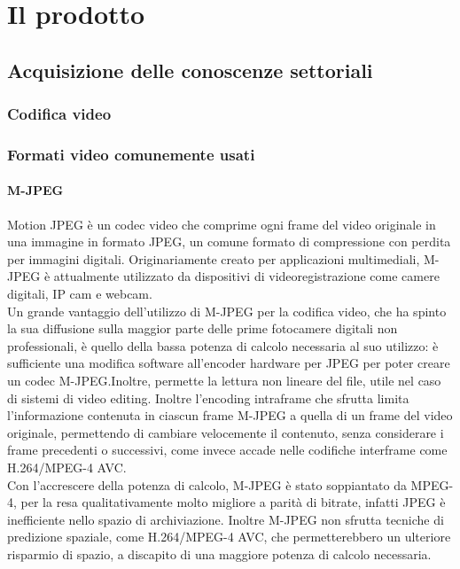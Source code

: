 \chapter{Il prodotto\label{cap:ilprodotto}}
\section{Acquisizione delle conoscenze settoriali}
	 \subsection{Codifica video}

	 \subsection{Formati video comunemente usati}
			\subsubsection{M-JPEG}
			Motion JPEG	è un codec video che comprime ogni frame del video originale in una immagine in formato JPEG, un comune formato di compressione con perdita per immagini digitali. Originariamente creato per applicazioni multimediali, M-JPEG è attualmente utilizzato da dispositivi di videoregistrazione come camere digitali, IP cam e webcam.
			\\
			Un grande vantaggio dell'utilizzo di M-JPEG per la codifica video, che ha spinto la sua diffusione sulla maggior parte delle prime fotocamere digitali non professionali, è quello della bassa potenza di calcolo necessaria al suo utilizzo: è sufficiente una modifica software all'encoder hardware per JPEG per poter creare un codec M-JPEG.\@ Inoltre, permette la lettura non lineare del file, utile nel caso di sistemi di video editing. Inoltre l'encoding intraframe che sfrutta limita l'informazione contenuta in ciascun frame M-JPEG a quella di un frame del video originale, permettendo di cambiare velocemente il contenuto, senza considerare i frame precedenti o successivi, come invece accade nelle codifiche interframe come H.264/MPEG-4 AVC.\@
			\\
			Con l'accrescere della potenza di calcolo, M-JPEG	è stato soppiantato da MPEG-4, per la resa qualitativamente molto migliore a parità di bitrate, infatti JPEG è inefficiente nello spazio di archiviazione. Inoltre M-JPEG non sfrutta tecniche di predizione spaziale, come H.264/MPEG-4 AVC, che permetterebbero un ulteriore risparmio di spazio, a discapito di una maggiore potenza di calcolo necessaria.

